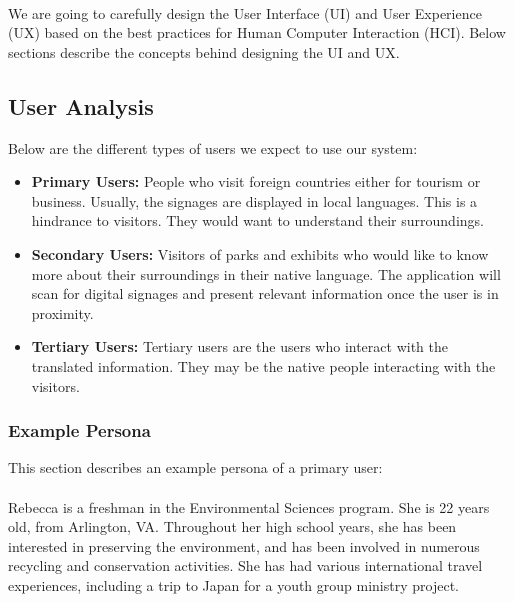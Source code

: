 \documentclass[12pt]{article}
\begin{document}
\paragraph{}We are going to carefully design the User Interface (UI) and User Experience (UX) based on the best practices for Human Computer Interaction (HCI). Below sections describe the concepts behind designing the UI and UX.

\subsection{User Analysis}

Below are the different types of users we expect to use our system:

\begin{itemize}

 \item \textbf{Primary Users:} People who visit foreign countries either for tourism or business. Usually, the signages are displayed in local languages. This is a hindrance to visitors. They would want to understand their surroundings.
 
  \item \textbf{Secondary Users:} Visitors of parks and exhibits who would like to know more about their surroundings in their native language. The application will scan for digital signages and present relevant information once the user is in proximity.
  
  \item \textbf{Tertiary Users: } Tertiary users are the users who interact with the translated information. They may be the native people interacting with the visitors. 
  
\end{itemize}

\subsubsection{Example Persona}
\label{persona}

This section describes an example persona of a primary user:

\paragraph{}Rebecca is a freshman in the Environmental Sciences program. She is 22 years old,
from Arlington, VA. Throughout her high school years, she has been interested in preserving the environment, and has been involved in numerous recycling and conservation activities. She has had various international travel experiences, including a trip to Japan for a youth group ministry project.
\end{document}
